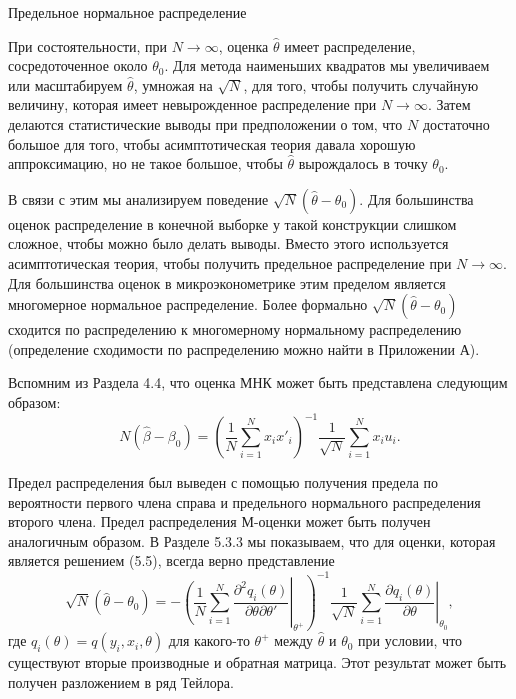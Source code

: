 \begin{center}
Предельное нормальное распределение
\end{center}

При состоятельности, при $N \rightarrow \infty$, оценка $\hat{\theta}$ имеет распределение, сосредоточенное около $\theta_0$. Для метода наименьших квадратов мы увеличиваем или масштабируем $\hat{\theta}$, умножая на $\sqrt{N}$, для того, чтобы получить случайную величину, которая имеет невырожденное распределение при $N \rightarrow \infty$. Затем делаются статистические выводы при предположении о том, что $N$ достаточно большое для того, чтобы асимптотическая теория давала хорошую аппроксимацию, но не такое большое, чтобы $\hat{\theta}$ вырождалось в точку $\theta_0$.

В связи с этим мы анализируем поведение $\sqrt{N}(\hat{\theta} - \theta_0)$. Для большинства оценок распределение в конечной выборке у такой конструкции слишком сложное, чтобы  можно было делать выводы. Вместо этого используется асимптотическая теория, чтобы получить предельное распределение при $N \rightarrow \infty$. Для большинства оценок в микроэконометрике этим пределом является многомерное нормальное распределение. Более формально 
$\sqrt{N}(\hat{\theta} - \theta_0)$ сходится по распределению к многомерному нормальному распределению (определение сходимости по распределению можно найти в Приложении А).

Вспомним из Раздела 4.4, что оценка МНК может быть представлена следующим образом:
\[
N(\hat{\beta} - \beta_0)= \left( \frac{1}{N} \sum_{i=1}^{N} x_i x'_i \right)^{-1} \frac{1}{\sqrt N} \sum_{i=1}^{N} x_i u_i.
\]

Предел распределения был выведен с помощью получения предела по вероятности первого члена справа и предельного нормального распределения второго члена. Предел распределения М-оценки может быть получен аналогичным образом. В Разделе 5.3.3 мы показываем, что для оценки, которая является решением (5.5), всегда верно представление
\begin{equation}
\sqrt{N}(\hat{\theta} - \theta_0)=- \left. \left(\frac{1}{N} \sum_{i=1}^{N} \frac{\partial^2 q_i(\theta)}{\partial \theta \partial \theta'} \right|_{\theta^+} \right)^{-1} \left. \frac{1}{\sqrt N} \sum_{i=1}^{N} \frac{\partial q_i(\theta)}{\partial \theta} \right|_{\theta_0},
\end{equation}
где $q_i(\theta)=q(y_i,x_i,\theta)$ для какого-то $\theta^+$ между $\hat{\theta}$ и $\theta_0$ при условии, что существуют вторые производные и обратная матрица. Этот результат может быть получен разложением в ряд Тейлора.

